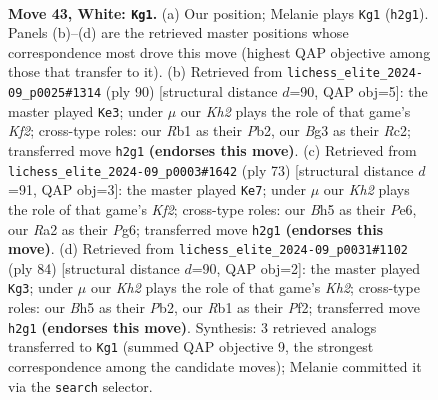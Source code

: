\documentclass[11pt]{article}
\begin{document}
\clearpage

\begin{figure}[p]\centering
\begin{subfigure}{0.46\textwidth}\centering
\resizebox{\linewidth}{!}{%
\newchessgame
\chessboard[
  setfen={3r3r/p5kp/7n/P5bB/8/1Pp3BP/R1P3PK/1R6 w - - 1 43},
  showmover=false,
  pgfstyle=straightmove, color=movearrow, markmove={h2-g1}
]}
\caption{}
\end{subfigure}\hfill
\begin{subfigure}{0.46\textwidth}\centering
\resizebox{\linewidth}{!}{%
\newchessgame
\chessboard[
  setfen={6rk/1p4r1/p2p1p2/P2PnB2/4PN2/7P/1PR2K2/8 w - - 3 46},
  showmover=false,
  pgfstyle=straightmove, color=movearrow, markmove={f2-e3}
]}
\caption{}
\end{subfigure}
\\[4pt]
\begin{subfigure}{0.46\textwidth}\centering
\resizebox{\linewidth}{!}{%
\newchessgame
\chessboard[
  setfen={8/r4kb1/2p1p1p1/pp5p/8/1PP4P/1P2KPP1/3R1N2 b - - 7 37},
  showmover=false,
  pgfstyle=straightmove, color=movearrow, markmove={f7-e7}
]}
\caption{}
\end{subfigure}\hfill
\begin{subfigure}{0.46\textwidth}\centering
\resizebox{\linewidth}{!}{%
\newchessgame
\chessboard[
  setfen={8/3rk1p1/1p3p1p/3r4/1PR3P1/R6P/1P3P1K/8 w - - 1 43},
  showmover=false,
  pgfstyle=straightmove, color=movearrow, markmove={h2-g3}
]}
\caption{}
\end{subfigure}
\caption{\textbf{Move 43, White: \texttt{Kg1}.} (a) Our position; Melanie plays \texttt{Kg1} (\texttt{h2g1}). Panels (b)--(d) are the retrieved master positions whose correspondence most drove this move (highest QAP objective among those that transfer to it). (b) Retrieved from \texttt{lichess\_elite\_2024-09\_p0025\#1314} (ply 90) [structural distance $d$=90, QAP obj=5]: the master played \texttt{Ke3}; under $\mu$ our \emph{Kh2} plays the role of that game's \emph{Kf2}; cross-type roles: our \emph{R}b1 as their \emph{P}b2, our \emph{B}g3 as their \emph{R}c2; transferred move \texttt{h2g1} \textbf{(endorses this move)}. (c) Retrieved from \texttt{lichess\_elite\_2024-09\_p0003\#1642} (ply 73) [structural distance $d$=91, QAP obj=3]: the master played \texttt{Ke7}; under $\mu$ our \emph{Kh2} plays the role of that game's \emph{Kf2}; cross-type roles: our \emph{B}h5 as their \emph{P}e6, our \emph{R}a2 as their \emph{P}g6; transferred move \texttt{h2g1} \textbf{(endorses this move)}. (d) Retrieved from \texttt{lichess\_elite\_2024-09\_p0031\#1102} (ply 84) [structural distance $d$=90, QAP obj=2]: the master played \texttt{Kg3}; under $\mu$ our \emph{Kh2} plays the role of that game's \emph{Kh2}; cross-type roles: our \emph{B}h5 as their \emph{P}b2, our \emph{R}b1 as their \emph{P}f2; transferred move \texttt{h2g1} \textbf{(endorses this move)}. Synthesis: 3 retrieved analogs transferred to \texttt{Kg1} (summed QAP objective 9, the strongest correspondence among the candidate moves); Melanie committed it via the \texttt{search} selector.}
\label{fig:thought-m84}
\end{figure}
\end{document}
